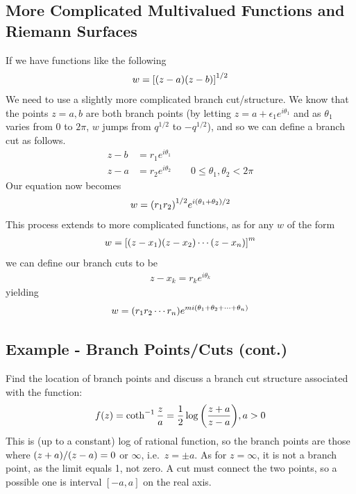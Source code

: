     \subsection{More Complicated Multivalued Functions and Riemann
    Surfaces}
    If we have functions like the following
    \begin{align*}
        w = {\left[ {\left( z-a \right)}{\left( z-b \right)} \right]}^{1/2}
    \end{align*}
    We need to use a slightly more complicated branch cut/structure. We know
    that the points $z=a, b$ are both branch points (by letting
        $z=a+\epsilon_1 e^{i\theta_1}$ and as $\theta_1$ varies from $0$ to
    $2\pi$, $w$ jumps from $q^{1/2}$ to $-q^{1/2}$), and so we can define a
    branch cut as follows.
    \begin{align*}
        z-b&=r_1e^{i\theta_1}\\
        z-a&=r_2e^{i\theta_2} \qquad 0 \le \theta_1, \theta_2 < 2 \pi
    \end{align*}
    Our equation now becomes
    \begin{align*}
        w={\left( r_1r_2 \right)}^{1/2} e^{i{\left( \theta_1 + \theta_2 \right)} / 2}
    \end{align*}
    This process extends to more complicated functions, as for any $w$ of
    the form
    \begin{align*}
        w={\left[ {\left( z-x_1 \right)}{\left( z-x_2 \right)}\cdots{\left( z-x_n \right)} \right]}^{m}
    \end{align*}
    we can define our branch cuts to be
    \begin{align*}
        z - x_k = r_k e^{i\theta_k}
    \end{align*}
    yielding
    \begin{align*}
        w={\left( r_1r_2\cdots r_n \right)}
        e^{m i {\left( \theta_1 + \theta_2 + \cdots + \theta_n \right)}}
    \end{align*}

    \subsection{Example - Branch Points/Cuts (cont.)}
    Find the location of branch points and discuss a branch cut structure
    associated with the function:
    \begin{align*}
        f(z) = \coth^{-1} \frac{z}{a} = \frac{1}{2}
        \log{\left( \frac{z+a}{z-a} \right)}, a > 0
    \end{align*}
    This is (up to a constant) log of rational function, so the branch
    points are those where ${\left( z+a \right)} / {\left( z-a \right)} = 0$ or $\infty$, i.e.\
    $z=\pm a$. As for $z=\infty$, it is not a branch point, as the limit
    equals 1, not zero. A cut must connect the two points, so a possible one
    is interval $[-a,a]$ on the real axis.

